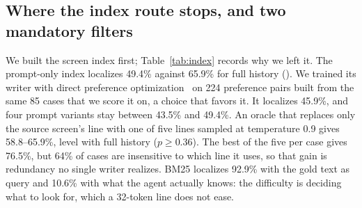 \subsection{Where the index route stops, and two mandatory filters}
\label{sec:index}
\begin{table}[t]
\centering\footnotesize\setlength{\tabcolsep}{4pt}
\caption{Short set ($n=85$), localization (\%). The screen index's writer cannot pass full history, and an oracle that rewrites only the source screen's line reaches full-history level and no higher.}
\label{tab:index}
\end{table}

We built the screen index first; Table~\ref{tab:index} records why we left it. The prompt-only index localizes 49.4\% against 65.9\% for full history (). We trained its writer with direct preference optimization~\citep{dpo} on 224 preference pairs built from the same 85 cases that we score it on, a choice that favors it. It localizes 45.9\%, and four prompt variants stay between 43.5\% and 49.4\%. An oracle that replaces only the source screen's line with one of five lines sampled at temperature 0.9 gives 58.8--65.9\%, level with full history ($p\ge0.36$). The best of the five per case gives 76.5\%, but 64\% of cases are insensitive to which line it uses, so that gain is redundancy no single writer realizes. BM25 localizes 92.9\% with the gold text as query and 10.6\% with what the agent actually knows: the difficulty is deciding what to look for, which a 32-token line does not ease.

